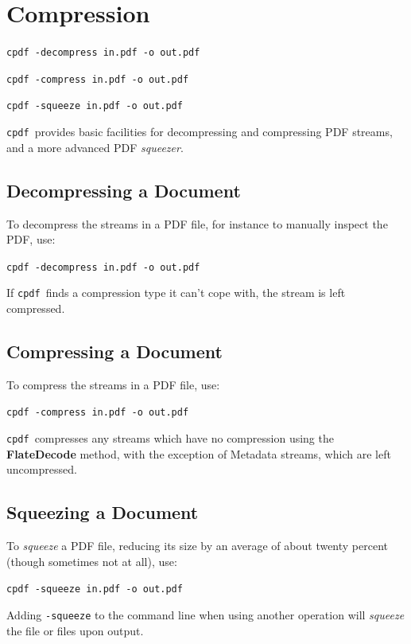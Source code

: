 \documentclass[a4paper,makeidx]{memoir}
\newcommand{\cpdf}{\texttt{cpdf}}
\begin{document}
\chapter{Compression}
  \begin{framed}
     \small\noindent\verb!cpdf -decompress in.pdf -o out.pdf!

     \vspace{1.5mm}
     \noindent\verb!cpdf -compress in.pdf -o out.pdf!
     
     \vspace{1.5mm}
     \noindent\verb!cpdf -squeeze in.pdf -o out.pdf!  
   \end{framed}
  \cpdf\ provides basic facilities for decompressing and compressing PDF streams, and a more advanced PDF \textit{squeezer}.
  \section{Decompressing a Document}
  To decompress the streams in a PDF file, for instance to manually inspect the
PDF, use:
  \begin{framed}
   \small\verb!cpdf -decompress in.pdf -o out.pdf!
  \end{framed}
  \noindent If \cpdf\ finds a compression type it can't cope with, the stream is left compressed.
  \section{Compressing a Document}
  To compress the streams in a PDF file, use:
  \begin{framed}
    \small\verb!cpdf -compress in.pdf -o out.pdf!
  \end{framed}
  \noindent\cpdf\ compresses any streams which have no compression using the
  \textbf{Flate\-Decode} method, with the exception of Metadata streams, which
  are left uncompressed.
  
  \section{Squeezing a Document}
  To \textit{squeeze} a PDF file, reducing its size by an average of about twenty percent (though sometimes not at all), use:
  \begin{framed}
    \small\verb!cpdf -squeeze in.pdf -o out.pdf!
  \end{framed}
  \noindent Adding \texttt{-squeeze} to the command line when using another operation will \textit{squeeze} the file or files upon output.
  
\end{document}
